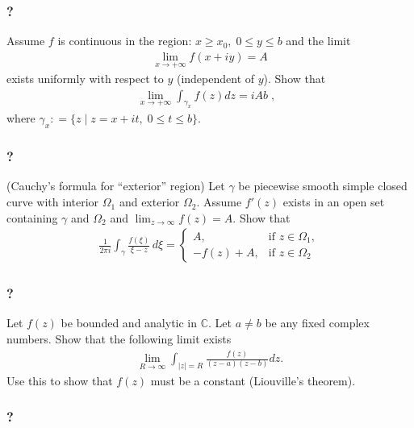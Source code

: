 \hypertarget{section-142}{%
\subsubsection{?}\label{section-142}}

Assume \(f\) is continuous in the region:
\(x \geq x_0, \; 0 \leq y \leq b\) and the limit
\begin{align*}\displaystyle \lim_{x \rightarrow + \infty} f(x + iy) = A\end{align*}
exists uniformly with respect to \(y\) (independent of \(y\)). Show that
\begin{align*}\lim_{x \rightarrow + \infty} \int_{\gamma_x} f(z) dz  = iA b \; , \; \;\end{align*}
where \(\gamma_x : = \{ z \; | \; z = x + it, \; 0 \leq t \leq b\}.\)

\hypertarget{section-143}{%
\subsubsection{?}\label{section-143}}

(Cauchy's formula for ``exterior'' region) Let \(\gamma\) be piecewise
smooth simple closed curve with interior \(\Omega_1\) and exterior
\(\Omega_2\). Assume \(f'(z)\) exists in an open set containing
\(\gamma\) and \(\Omega_2\) and
\(\lim_{z \rightarrow \infty } f(z) = A\). Show that
\begin{align*}\frac{1}{2 \pi i} \int_\gamma \frac{f(\xi)}{\xi - z} \, d \xi =
\begin{cases}
A,          &     \text{if\ $z \in \Omega_1$}, \\
-f (z) + A, &  \text{if\ $z \in \Omega_2$}
\end{cases}\end{align*}

\hypertarget{section-144}{%
\subsubsection{?}\label{section-144}}

Let \(f(z)\) be bounded and analytic in \(\mathbb C\). Let \(a \neq b\)
be any fixed complex numbers. Show that the following limit exists
\begin{align*}\lim_{R \rightarrow \infty} \int_{|z|=R} \frac{f(z)}{(z-a)(z-b)} dz.\end{align*}
Use this to show that \(f(z)\) must be a constant (Liouville's theorem).

\hypertarget{section-145}{%
\subsubsection{?}\label{section-145}}

